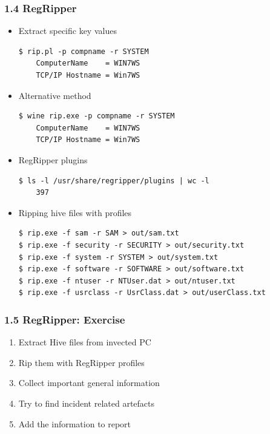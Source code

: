 \begin{frame}[fragile]
  \frametitle{1.4 RegRipper}
  \begin{itemize}
      \item Extract specific key values
  \begin{lstlisting}[basicstyle=\tiny]
$ rip.pl -p compname -r SYSTEM
	ComputerName    = WIN7WS
	TCP/IP Hostname = Win7WS
  \end{lstlisting}
      \item Alternative method
  \begin{lstlisting}[basicstyle=\tiny]
$ wine rip.exe -p compname -r SYSTEM
	ComputerName    = WIN7WS
	TCP/IP Hostname = Win7WS
  \end{lstlisting}
      \item RegRipper plugins
  \begin{lstlisting}[basicstyle=\tiny]
$ ls -l /usr/share/regripper/plugins | wc -l
	397
  \end{lstlisting}
      \item Ripping hive files with profiles
  \begin{lstlisting}[basicstyle=\tiny]
$ rip.exe -f sam -r SAM > out/sam.txt
$ rip.exe -f security -r SECURITY > out/security.txt
$ rip.exe -f system -r SYSTEM > out/system.txt
$ rip.exe -f software -r SOFTWARE > out/software.txt
$ rip.exe -f ntuser -r NTUser.dat > out/ntuser.txt
$ rip.exe -f usrclass -r UsrClass.dat > out/userClass.txt
  \end{lstlisting}
  \end{itemize}
\end{frame}


\begin{frame}[fragile]
  \frametitle{1.5 RegRipper: Exercise}
  \begin{enumerate}
      \item Extract Hive files from invected PC
      \item Rip them with RegRipper profiles
      \item Collect important general information
      \item Try to find incident related artefacts
      \item Add the information to report
  \end{enumerate}
\end{frame}


